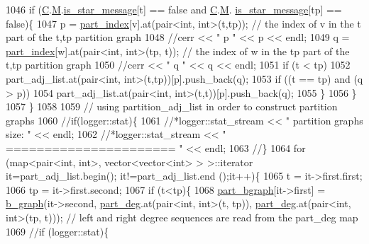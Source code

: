 \begin{DoxyCode}
1046       \textcolor{keywordflow}{if} (\hyperlink{classmarked__graph__encoder_af82bc0653414091291cb75553a407bdb}{C}.\hyperlink{classcolored__graph_ab72c568fe12f7c849ca6bffb145aec47}{M}.\hyperlink{classgraph__message_a55ff5531a0043106369e84a7bc45e22d}{is\_star\_message}[t] == \textcolor{keyword}{false} and \hyperlink{classmarked__graph__encoder_af82bc0653414091291cb75553a407bdb}{C}.\hyperlink{classcolored__graph_ab72c568fe12f7c849ca6bffb145aec47}{M}.
      \hyperlink{classgraph__message_a55ff5531a0043106369e84a7bc45e22d}{is\_star\_message}[tp] == \textcolor{keyword}{false})\{
1047         p = \hyperlink{classmarked__graph__encoder_a1d3e2b90f5d46244fd4cb33c69ac81f1}{part\_index}[v].at(pair<int, int>(t,tp)); \textcolor{comment}{// the index of v in the t part of the t,tp
       partition graph}
1048         \textcolor{comment}{//cerr << " p " << p << endl;}
1049         q = \hyperlink{classmarked__graph__encoder_a1d3e2b90f5d46244fd4cb33c69ac81f1}{part\_index}[w].at(pair<int, int>(tp, t)); \textcolor{comment}{// the index of w in the tp part of the t,tp
       partition graph}
1050         \textcolor{comment}{//cerr << " q " << q << endl;}
1051         \textcolor{keywordflow}{if} (t < tp)
1052           part\_adj\_list.at(pair<int, int>(t,tp))[p].push\_back(q);
1053         \textcolor{keywordflow}{if} ((t == tp) and (q > p))
1054           part\_adj\_list.at(pair<int, int>(t,t))[p].push\_back(q);
1055       \}
1056     \}
1057   \}
1058 
1059   \textcolor{comment}{// using partition\_adj\_list in order to construct partition graphs}
1060   \textcolor{comment}{//if(logger::stat)\{}
1061   \textcolor{comment}{//*logger::stat\_stream << " partition graphs size: " << endl;}
1062   \textcolor{comment}{//*logger::stat\_stream << " ====================== " << endl;}
1063   \textcolor{comment}{//\}}
1064   \textcolor{keywordflow}{for} (map<pair<int, int>, vector<vector<int> > >::iterator it=part\_adj\_list.begin(); it!=part\_adj\_list.end
      ();it++)\{
1065     t = it->first.first;
1066     tp = it->first.second;
1067     \textcolor{keywordflow}{if} (t<tp)\{
1068       \hyperlink{classmarked__graph__encoder_a5faebef707fb681c0b6c2ccf64abc04c}{part\_bgraph}[it->first] = \hyperlink{classb__graph}{b\_graph}(it->second, \hyperlink{classmarked__graph__encoder_a55ea2edb2609dfc287432f61900d6ad1}{part\_deg}.at(pair<int, int>(t,
      tp)), \hyperlink{classmarked__graph__encoder_a55ea2edb2609dfc287432f61900d6ad1}{part\_deg}.at(pair<int, int>(tp, t))); \textcolor{comment}{// left and right degree sequences are read from the
       part\_deg map}
1069       \textcolor{comment}{//if (logger::stat)\{}

\end{DoxyCode}
